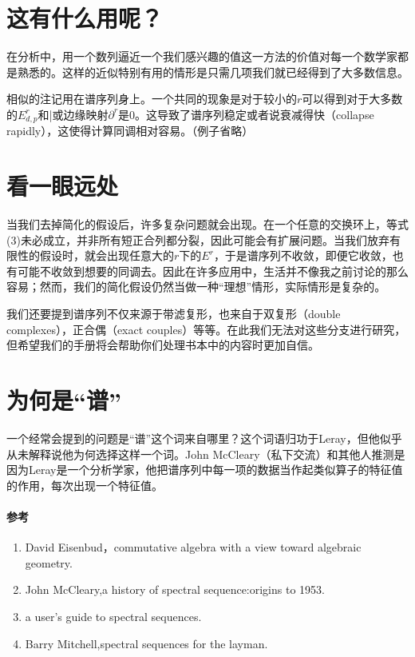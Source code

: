 \documentclass[a4paper,11pt,openany]{ctexart}
\begin{document}
\section{这有什么用呢？}
在分析中，用一个数列逼近一个我们感兴趣的值这一方法的价值对每一个数学家都是熟悉的。这样的近似特别有用的情形是只需几项我们就已经得到了大多数信息。

相似的注记用在谱序列身上。一个共同的现象是对于较小的$r$可以得到对于大多数的$E^r_{d,p}$和|或边缘映射$\partial^r$是$0$。这导致了谱序列稳定或者说衰减得快（collapse rapidly），这使得计算同调相对容易。（例子省略）
\section{看一眼远处}
当我们去掉简化的假设后，许多复杂问题就会出现。在一个任意的交换环上，等式(3)未必成立，并非所有短正合列都分裂，因此可能会有扩展问题。当我们放弃有限性的假设时，就会出现任意大的$r$下的$E^r$，于是谱序列不收敛，即便它收敛，也有可能不收敛到想要的同调去。因此在许多应用中，生活并不像我之前讨论的那么容易；然而，我们的简化假设仍然当做一种“理想”情形，实际情形是复杂的。

我们还要提到谱序列不仅来源于带滤复形，也来自于双复形（double complexes），正合偶（exact couples）等等。在此我们无法对这些分支进行研究，但希望我们的手册将会帮助你们处理书本中的内容时更加自信。
\section{为何是“谱”}
一个经常会提到的问题是“谱”这个词来自哪里？这个词语归功于Leray，但他似乎从未解释说他为何选择这样一个词。John McCleary（私下交流）和其他人推测是因为Leray是一个分析学家，他把谱序列中每一项的数据当作起类似算子的特征值的作用，每次出现一个特征值。
\paragraph{参考}
\begin{enumerate}
  \item David Eisenbud，commutative algebra with a view toward algebraic geometry.
  \item John McCleary,a history of spectral sequence:origins to 1953.
  \item a user's guide to spectral sequences.
  \item Barry Mitchell,spectral sequences for the layman.
\end{enumerate}
\end{document}
